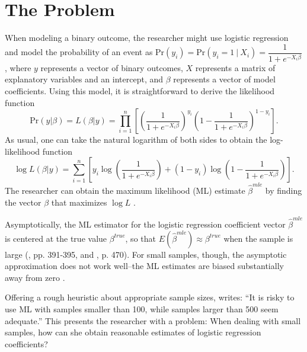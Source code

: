 \documentclass[12pt]{article}
\begin{document}
\section*{The Problem}

When modeling a binary outcome, the researcher might use logistic regression and model the probability of an event as $\text{Pr}(y_i) = \text{Pr}(y_i = 1~|~ X_i) = \dfrac{1}{1 + e^{-X_i\beta}}$, where $y$ represents a vector of binary outcomes, $X$ represents a matrix of explanatory variables and an intercept, and $\beta$ represents a vector of model coefficients. 
Using this model, it is straightforward to derive the likelihood function 
\begin{equation}\nonumber
\text{Pr}(y | \beta) = L(\beta | y) = \displaystyle \prod_{i = 1}^n \left[\left( \dfrac{1}{1 + e^{-X_i\beta}}\right)^{y_i}\left(1- \dfrac{1}{1 + e^{-X_i\beta}}\right)^{1 - y_i}\right]\text{.}
\end{equation}
\noindent As usual, one can take the natural logarithm of both sides to obtain the log-likelihood function 
\begin{equation}\nonumber
\log L(\beta | y) = \displaystyle \sum_{i = 1}^n \left[y_i \log \left( \dfrac{1}{1 + e^{-X_i\beta}}\right) + (1 - y_i) \log \left(1- \dfrac{1}{1 + e^{-X_i\beta}}\right)\right].
\end{equation}
\noindent The researcher can obtain the maximum likelihood (ML) estimate $\hat{\beta}^{mle}$ by finding the vector $\beta$ that maximizes $\log L$ \citep{King1989}. 

Asymptotically, the ML estimator for the logistic regression coefficient vector $\hat{\beta}^{mle}$ is centered at the true value $\beta^{true}$, so that $E(\hat{\beta}^{mle}) \approx \beta^{true}$ when the sample is large (\citealt{Wooldridge2002}, pp. 391-395, and \citealt{CasellaBerger2002}, p. 470).
For small samples, though, the asymptotic approximation does not work well--the ML estimates are biased substantially away from zero \citep[pp. 53-54]{Long1997}.

Offering a rough heuristic about appropriate sample sizes, \cite[p. 54]{Long1997} writes: ``It is risky to use ML with samples smaller than 100, while samples larger than 500 seem adequate.''
This presents the researcher with a problem: When dealing with small samples, how can she obtain reasonable estimates of logistic regression coefficients?
\end{document}
